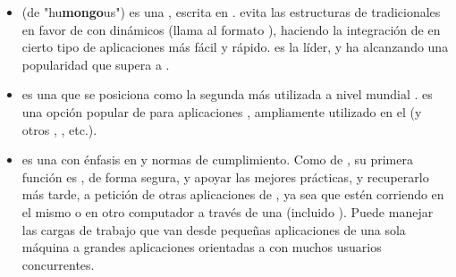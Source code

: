 	\begin{itemize}
		\item
			\textbf{\mongodbNAME} (de "hu\textbf{mongo}us") es una \dataBasesDB \documentOriented \openSourcePC, escrita en \cPlusPlus \cite{technology_mongodb}. \mongodbNAME evita las estructuras de \dataBasesDB tradicionales \tableBasedDB en favor de \documentsDB \jsonLikeCPT con \schemasDB dinámicos (\mongodbNAME llama al formato \bsonNAME), haciendo la integración de \dataPC en cierto tipo de aplicaciones más fácil y rápido. \mongodbNAME es la \nosqlNAME líder, y ha alcanzando una popularidad que supera a \postgresql \cite{online_db_engines_ranking}.
	
		\item
			\textbf{\mysqlNAME} es una \rdbms \openSourcePC que se posiciona como la segunda más utilizada a nivel mundial \cite{online_db_engines_ranking}\cite{online_dispelling_myths}. \mysqlNAME es una opción popular de \dataBasesDB para aplicaciones \webINT, ampliamente utilizado en el \stackAS \lampNAME (y otros \stacksAS, \ampNAME, etc.).
	
		\item
			\textbf{\postgresql} es una \ordbms con énfasis en \extensibilityQA y normas de cumplimiento. Como \serverAS de \dataBasesDB, su primera función es \store \dataPC, de forma segura, y apoyar las mejores prácticas, y recuperarlo más tarde, a petición de otras aplicaciones de \softwarePC, ya sea que estén corriendo en el mismo o en otro computador a través de una \networkINT (incluido \internetINT). Puede manejar las cargas de trabajo que van desde pequeñas aplicaciones de una sola máquina a grandes aplicaciones orientadas a \internetINT con muchos usuarios concurrentes.
	

\end{itemize}
